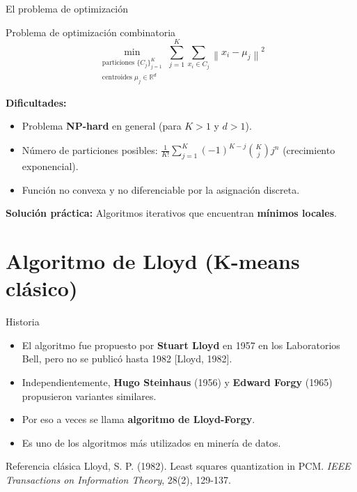 \documentclass[aspectratio=169]{beamer}
\newcommand{\R}{\mathbb{R}}
\newcommand{\norm}[1]{\left\lVert #1 \right\rVert}
\begin{document}
\begin{frame}{El problema de optimización}
    \begin{block}{Problema de optimización combinatoria}
        \[
        \min_{\substack{\text{particiones }\{C_j\}_{j=1}^K \\ \text{centroides } \mu_j \in \R^d}} \sum_{j=1}^K \sum_{x_i \in C_j} \norm{x_i - \mu_j}^2
        \]
    \end{block}
    
    \pause
    \textbf{Dificultades:}
    \begin{itemize}
        \item Problema \textbf{NP-hard} en general (para \(K>1\) y \(d>1\)).
        \item Número de particiones posibles: \(\frac{1}{K!} \sum_{j=1}^K (-1)^{K-j} \binom{K}{j} j^n\) (crecimiento exponencial).
        \item Función no convexa y no diferenciable por la asignación discreta.
    \end{itemize}
    
    \pause
    \textbf{Solución práctica:} Algoritmos iterativos que encuentran \textbf{mínimos locales}.
\end{frame}

\section{Algoritmo de Lloyd (K-means clásico)}

\begin{frame}{Historia}
    \begin{itemize}
        \item El algoritmo fue propuesto por \textbf{Stuart Lloyd} en 1957 en los Laboratorios Bell, pero no se publicó hasta 1982 [Lloyd, 1982].
        \item Independientemente, \textbf{Hugo Steinhaus} (1956) y \textbf{Edward Forgy} (1965) propusieron variantes similares.
        \item Por eso a veces se llama \textbf{algoritmo de Lloyd-Forgy}.
        \item Es uno de los algoritmos más utilizados en minería de datos.
    \end{itemize}
    
    \begin{block}{Referencia clásica}
        Lloyd, S. P. (1982). Least squares quantization in PCM. \textit{IEEE Transactions on Information Theory}, 28(2), 129-137.
    \end{block}
\end{frame}
\end{document}
